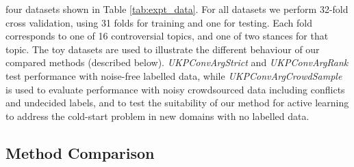 four datasets shown in Table \ref{tab:expt_data}.
For all datasets we perform 32-fold cross validation, using 31 folds for training and one for testing. 
Each fold corresponds to one of 16 controversial topics, and one of two stances for that topic.
The toy datasets are used to illustrate the different behaviour of our compared methods (described below).
\emph{UKPConvArgStrict} and \emph{UKPConvArgRank} test performance with noise-free labelled data,
while \emph{UKPConvArgCrowdSample} is used to evaluate performance with noisy crowdsourced data 
including conflicts and undecided labels, and to test the suitability of our method for active learning
to address the cold-start problem in new domains with no labelled data.
 
\subsection{Method Comparison}

